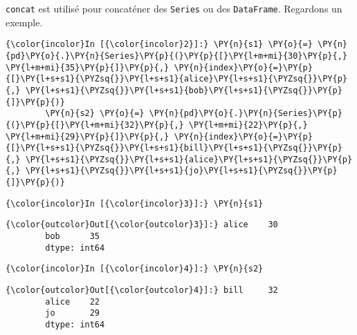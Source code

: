     \texttt{concat} est utilisé pour concaténer des \texttt{Series} ou des
\texttt{DataFrame}. Regardons un exemple.

    \begin{Verbatim}[commandchars=\\\{\},frame=single,framerule=0.3mm,rulecolor=\color{cellframecolor}]
{\color{incolor}In [{\color{incolor}2}]:} \PY{n}{s1} \PY{o}{=} \PY{n}{pd}\PY{o}{.}\PY{n}{Series}\PY{p}{(}\PY{p}{[}\PY{l+m+mi}{30}\PY{p}{,} \PY{l+m+mi}{35}\PY{p}{]}\PY{p}{,} \PY{n}{index}\PY{o}{=}\PY{p}{[}\PY{l+s+s1}{\PYZsq{}}\PY{l+s+s1}{alice}\PY{l+s+s1}{\PYZsq{}}\PY{p}{,} \PY{l+s+s1}{\PYZsq{}}\PY{l+s+s1}{bob}\PY{l+s+s1}{\PYZsq{}}\PY{p}{]}\PY{p}{)}
        \PY{n}{s2} \PY{o}{=} \PY{n}{pd}\PY{o}{.}\PY{n}{Series}\PY{p}{(}\PY{p}{[}\PY{l+m+mi}{32}\PY{p}{,} \PY{l+m+mi}{22}\PY{p}{,} \PY{l+m+mi}{29}\PY{p}{]}\PY{p}{,} \PY{n}{index}\PY{o}{=}\PY{p}{[}\PY{l+s+s1}{\PYZsq{}}\PY{l+s+s1}{bill}\PY{l+s+s1}{\PYZsq{}}\PY{p}{,} \PY{l+s+s1}{\PYZsq{}}\PY{l+s+s1}{alice}\PY{l+s+s1}{\PYZsq{}}\PY{p}{,} \PY{l+s+s1}{\PYZsq{}}\PY{l+s+s1}{jo}\PY{l+s+s1}{\PYZsq{}}\PY{p}{]}\PY{p}{)}
\end{Verbatim}


    \begin{Verbatim}[commandchars=\\\{\},frame=single,framerule=0.3mm,rulecolor=\color{cellframecolor}]
{\color{incolor}In [{\color{incolor}3}]:} \PY{n}{s1}
\end{Verbatim}


\begin{Verbatim}[commandchars=\\\{\},frame=single,framerule=0.3mm,rulecolor=\color{cellframecolor}]
{\color{outcolor}Out[{\color{outcolor}3}]:} alice    30
        bob      35
        dtype: int64
\end{Verbatim}
            
    \begin{Verbatim}[commandchars=\\\{\},frame=single,framerule=0.3mm,rulecolor=\color{cellframecolor}]
{\color{incolor}In [{\color{incolor}4}]:} \PY{n}{s2}
\end{Verbatim}


\begin{Verbatim}[commandchars=\\\{\},frame=single,framerule=0.3mm,rulecolor=\color{cellframecolor}]
{\color{outcolor}Out[{\color{outcolor}4}]:} bill     32
        alice    22
        jo       29
        dtype: int64
\end{Verbatim}
            
